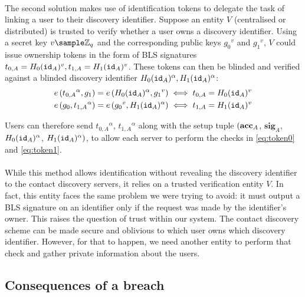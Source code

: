 \paragraph{} The second solution makes use of identification tokens to delegate the task of linking a user to their discovery identifier. Suppose an entity $V$ (centralised or distributed) is trusted to verify whether a user owns a discovery identifier. Using a secret key $v \sample \mathbb{Z}_q$ and the corresponding public keys ${g_0}^v$ and ${g_1}^v $, $V$ could issue ownership tokens in the form of BLS signatures $t_{0,A}= H_0(\mathtt{id}_A)^v, t_{1,A}=H_1(\mathtt{id}_A)^v$. These tokens can then be blinded and verified against a blinded discovery identifier $H_0(\mathtt{id}_A)^\alpha, H_1(\mathtt{id}_A)^\alpha$:
\begin{align}
	\label{eq:token0}
	e\left({t_{0,A}}^\alpha, g_1 \right) = e\left(H_0(\mathtt{id}_A)^\alpha, {g_1}^v \right) &\iff t_{0,A} = H_0(\mathtt{id}_A)^v \\
	\label{eq:token1}
	e\left(g_0, {t_{1,A}}^\alpha \right) = e\left({g_0}^v, H_1(\mathtt{id}_A)^\alpha \right) &\iff t_{1,A} = H_1(\mathtt{id}_A)^v
\end{align}

\noindent Users can therefore send ${t_{0,A}}^\alpha$, ${t_{1,A}}^\alpha$ along with the setup tuple $(\mathbf{acc}_A$, $\mathbf{sig}_A$, $H_0(\mathtt{id}_A)^\alpha$, $H_1(\mathtt{id}_A)^\alpha)$, to allow each server to perform the checks in \autoref{eq:token0} and \autoref{eq:token1}. 

\paragraph{} While this method allows identification without revealing the discovery identifier to the contact discovery servers, it relies on a trusted verification entity $V$. In fact, this entity faces the same problem we were trying to avoid: it must output a BLS signature on an identifier only if the request was made by the identifier's owner. This raises the question of trust within our system. The contact discovery scheme can be made secure and oblivious to which user owns which discovery identifier. However, for that to happen, we need another entity to perform that check and gather private information about the users.

	\subsection{Consequences of a breach}
	
